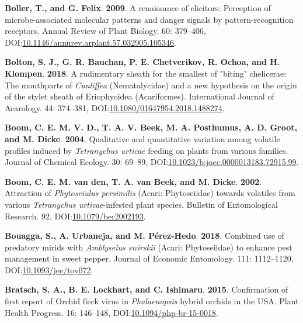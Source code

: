 \documentclass[12pt,final,CPage]{ufthesis}
\newlength{\cslhangindent}
\newenvironment{CSLReferences}[2] %
{%
	\setlength{\parindent}{0pt}
	\ifodd #1 \everypar{\setlength{\hangindent}{\cslhangindent}}\ignorespaces\fi
	\ifnum #2 > 0
	\setlength{\parskip}{#2\baselineskip}
	\fi
}%
{}
\begin{document}
{\begin{CSLReferences}{1}{0}
  \leavevmode{}%
  \textbf{Boller, T., and G. Felix}. \textbf{2009}. A renaissance of elicitors: Perception of microbe-associated molecular patterns and danger signals by pattern-recognition receptors. Annual Review of Plant Biology. 60: 379--406, DOI:\href{https://doi.org/10.1146/annurev.arplant.57.032905.105346}{10.1146/annurev.arplant.57.032905.105346}.

  \leavevmode{}%
  \textbf{Bolton, S. J., G. R. Bauchan, P. E. Chetverikov, R. Ochoa, and H. Klompen}. \textbf{2018}. A rudimentary sheath for the smallest of "biting" chelicerae: The mouthparts of {\emph{Cunliffea}} ({Nematalycidae}) and a new hypothesis on the origin of the stylet sheath of {Eriophyoidea} ({Acariformes}). International Journal of Acarology. 44: 374--381, DOI:\href{https://doi.org/10.1080/01647954.2018.1488274}{10.1080/01647954.2018.1488274}.

  \leavevmode{}%
  \textbf{Boom, C. E. M. V. D., T. A. V. Beek, M. A. Posthumus, A. D. Groot, and M. Dicke}. \textbf{2004}. Qualitative and quantitative variation among volatile profiles induced by {\emph{Tetranychus urticae}} feeding on plants from various families. Journal of Chemical Ecology. 30: 69--89, DOI:\href{https://doi.org/10.1023/b:joec.0000013183.72915.99}{10.1023/b:joec.0000013183.72915.99}.

  \leavevmode{}%
  \textbf{Boom, C. E. M. van den, T. A. van Beek, and M. Dicke}. \textbf{2002}. Attraction of {\emph{Phytoseiulus persimilis}} ({Acari}: {Phytoseiidae}) towards volatiles from various {\emph{Tetranychus urticae}}-infested plant species. Bulletin of Entomological Research. 92, DOI:\href{https://doi.org/10.1079/ber2002193}{10.1079/ber2002193}.

  \leavevmode{}%
  \textbf{Bouagga, S., A. Urbaneja, and M. Pérez-Hedo}. \textbf{2018}. Combined use of predatory mirids with {\emph{Amblyseius swirskii}} ({Acari}: {Phytoseiidae}) to enhance pest management in sweet pepper. Journal of Economic Entomology. 111: 1112--1120, DOI:\href{https://doi.org/10.1093/jee/toy072}{10.1093/jee/toy072}.

  \leavevmode{}%
  \textbf{Bratsch, S. A., B. E. Lockhart, and C. Ishimaru}. \textbf{2015}. Confirmation of first report of {Orchid fleck virus} in {\emph{Phalaenopsis}} hybrid orchids in the {USA}. Plant Health Progress. 16: 146--148, DOI:\href{https://doi.org/10.1094/php-br-15-0018}{10.1094/php-br-15-0018}.


\end{CSLReferences}}
\end{document}
